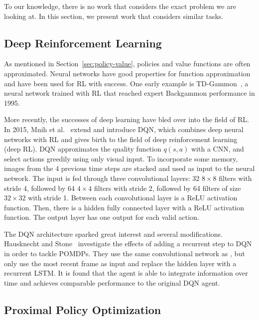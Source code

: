To our knowledge, there is no work that considers the exact problem we are looking at.
In this section, we present work that considers similar tasks.

\subsection{Deep Reinforcement Learning}


As mentioned in Section~\ref{sec:policy-value}, policies and value functions are often approximated.
Neural networks have good properties for function approximation and have been used for RL with success.
One early example is TD-Gammon~\cite{tesauro1995tdgammon}, a neural network trained with RL that reached expert Backgammon performance in 1995.

More recently, the successes of deep learning have bled over into the field of RL.
In 2015, Mnih et al.~\cite{mnih_human_2015} extend \cite{mnih_atari_2013} and introduce DQN, which combines deep neural networks with RL and gives birth to the field of deep reinforcement learning (deep RL).
DQN approximates the quality function \(q(s, a)\) with a CNN, and select actions greedily using only visual input.
To incorporate some memory, images from the 4 previous time steps are stacked and used as input to the neural network.
The input is fed through three convolutional layers:
32 \(8\times8\) filters with stride 4,
followed by 64 \(4\times4\) filters with stride 2,
followed by 64 filters of size \(32\times32\) with stride 1.
Between each convolutional layer is a ReLU activation function.
Then, there is a hidden fully connected layer with a ReLU activation function.
The output layer has one output for each valid action.

The DQN architecture sparked great interest and several modifications.
Hausknecht and Stone~\cite{hausknecht_stone_2017} investigate the effects of adding a recurrent step to DQN in order to tackle POMDPs.
They use the same convolutional network as \cite{mnih_human_2015}, but only use the most recent frame as input and replace the hidden layer with a recurrent LSTM.
It is found that the agent is able to integrate information over time and achieves comparable performance to the original DQN agent.

\subsection{Proximal Policy Optimization}

